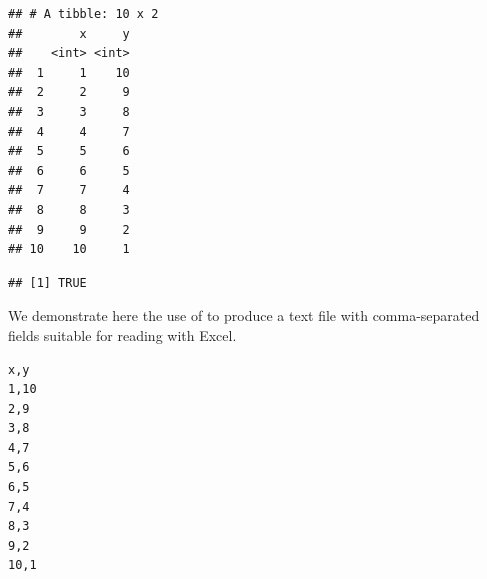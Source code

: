 \documentclass[krantz2]{krantz}\usepackage{knitr}%
\begin{document}
\begin{knitrout}\footnotesize
{}\color{fgcolor}\begin{kframe}
\begin{alltt}
 \hlkwb{<-} \hlstd{(} \hlstd{=} \hlstd{)}
\end{alltt}


{\ttfamily\noindent\itshape\color{messagecolor}{\#\# Parsed with column specification:\\\#\# cols(\\\#\#\ \  x = col\_integer(),\\\#\#\ \  y = col\_integer()\\\#\# )}}\begin{alltt}
\end{alltt}
\begin{verbatim}
## # A tibble: 10 x 2
##        x     y
##    <int> <int>
##  1     1    10
##  2     2     9
##  3     3     8
##  4     4     7
##  5     5     6
##  6     6     5
##  7     7     4
##  8     8     3
##  9     9     2
## 10    10     1
\end{verbatim}
\begin{alltt}
  \hlstd{=} \hlstd{)}
\end{alltt}
\begin{verbatim}
## [1] TRUE
\end{verbatim}
\end{kframe}
\end{knitrout}

We demonstrate here the use of  to produce a text file with comma-separated fields suitable for reading with Excel.
\begin{knitrout}\footnotesize
{}\color{fgcolor}\begin{kframe}
\begin{alltt}
  \hlstd{=} \hlstd{)}
\hlstd{(}\hlstd{,}  \hlstd{=} \hlstd{)}
\end{alltt}
\end{kframe}
\end{knitrout}

\begin{knitrout}\footnotesize
{}\color{fgcolor}\begin{kframe}
\begin{verbatim}
﻿x,y
1,10
2,9
3,8
4,7
5,6
6,5
7,4
8,3
9,2
10,1
\end{verbatim}
\end{kframe}
\end{knitrout}
\end{document}
